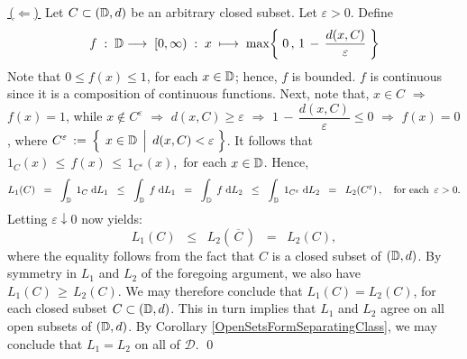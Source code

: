 \vskip 0.5cm
\noindent
\underline{\,($\Longleftarrow$)\,}\;\;
Let $C \subset (\mathbb{D},d)$ be an arbitrary closed subset.
Let $\varepsilon > 0$. Define 
\begin{equation*}
f
\; : \; \mathbb{D} \longrightarrow \; [0,\infty) \; : \;
x \; \longmapsto\;  \max\!\left\{\; 0\,,\, 1\,-\,\dfrac{d(x,C)}{\varepsilon} \;\right\}
\end{equation*}
Note that $0 \leq f(x) \leq 1$, for each $x \in \mathbb{D}$; hence, $f$ is bounded.
$f$ is continuous since it is a composition of continuous functions.
Next, note that, $x \in C$ $\Longrightarrow$ $f(x) = 1$, while 
$x \notin C^{\varepsilon}$
\;$\Longrightarrow$\; $d(x,C) \geq \varepsilon$
\;$\Longrightarrow$\; $1\,-\,\dfrac{d(x,C)}{\varepsilon} \leq 0$
\;$\Longrightarrow$\; $f(x) = 0$,
where $C^{\varepsilon} \,:=\, \left\{\;\left.x \overset{{\color{white}.}}{\in} \D \;\,\right\vert\; d(x,C) < \varepsilon\;\right\}$.
It follows that \,$1_{C}(x) \,\leq\, f(x) \,\leq\, 1_{C^{\varepsilon}}(x)$,\, for each $x\in\mathbb{D}$.
Hence,
\begin{equation*}
L_{1}(C)
\;\; = \;\;
	\int_{\mathbb{D}}\;1_{C}\;\textnormal{d} L_{1}
\;\; \leq \;\;
	\int_{\mathbb{D}}\;f\;\textnormal{d} L_{1}
\;\; = \;\;
	\int_{\mathbb{D}}\;f\;\textnormal{d} L_{2}
\;\; \leq \;\;
	\int_{\mathbb{D}}\;1_{C^{\varepsilon}}\;\textnormal{d} L_{2}
\;\; = \;\;
	L_{2}(C^{\varepsilon})\,,
	\quad
	\textnormal{for each \,$\varepsilon > 0$}.
\end{equation*}
Letting $\varepsilon \downarrow 0$ now yields:
\begin{equation*}
L_{1}(C) \;\; \leq \;\; L_{2}\!\left(\,\overline{C}\,\right) \;\; = \;\; L_{2}(C),
\end{equation*}
where the equality follows from the fact that $C$ is a closed subset of $(\mathbb{D},d)$.
By symmetry in $L_{1}$ and $L_{2}$ of the foregoing argument,
we also have $L_{1}(C) \,\geq\, L_{2}(C)$.
We may therefore conclude that $L_{1}(C) = L_{2}(C)$,
for each closed subset $C \subset (\mathbb{D},d)$.
This in turn implies that $L_{1}$ and $L_{2}$ agree on all open subsets of $(\mathbb{D},d)$.
By Corollary \ref{OpenSetsFormSeparatingClass},
we may conclude that $L_{1} = L_{2}$ on all of $\mathcal{D}$.
\qed



